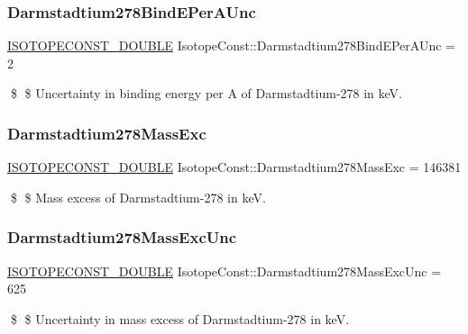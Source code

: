 \subsubsection{\texorpdfstring{Darmstadtium278\+Bind\+E\+Per\+A\+Unc}{Darmstadtium278BindEPerAUnc}}
{\footnotesize\ttfamily \mbox{\hyperlink{group___isotope_const-_macros_ga8f45a7272ce02c0b4c65c44636ed719a}{I\+S\+O\+T\+O\+P\+E\+C\+O\+N\+S\+T\+\_\+\+D\+O\+U\+B\+LE}} Isotope\+Const\+::\+Darmstadtium278\+Bind\+E\+Per\+A\+Unc = 2}

\$ \$ Uncertainty in binding energy per A of Darmstadtium-\/278 in keV. \mbox{\label{group___isotope_const-_darmstadtium-_ds278_ga666af747b9909806fc544dac715f6537}} 
\subsubsection{\texorpdfstring{Darmstadtium278\+Mass\+Exc}{Darmstadtium278MassExc}}
{\footnotesize\ttfamily \mbox{\hyperlink{group___isotope_const-_macros_ga8f45a7272ce02c0b4c65c44636ed719a}{I\+S\+O\+T\+O\+P\+E\+C\+O\+N\+S\+T\+\_\+\+D\+O\+U\+B\+LE}} Isotope\+Const\+::\+Darmstadtium278\+Mass\+Exc = 146381}

\$ \$ Mass excess of Darmstadtium-\/278 in keV. \mbox{\label{group___isotope_const-_darmstadtium-_ds278_gaf7870045f130d95065b8c020577cf480}} 
\subsubsection{\texorpdfstring{Darmstadtium278\+Mass\+Exc\+Unc}{Darmstadtium278MassExcUnc}}
{\footnotesize\ttfamily \mbox{\hyperlink{group___isotope_const-_macros_ga8f45a7272ce02c0b4c65c44636ed719a}{I\+S\+O\+T\+O\+P\+E\+C\+O\+N\+S\+T\+\_\+\+D\+O\+U\+B\+LE}} Isotope\+Const\+::\+Darmstadtium278\+Mass\+Exc\+Unc = 625}

\$ \$ Uncertainty in mass excess of Darmstadtium-\/278 in keV. \mbox{\label{group___isotope_const-_darmstadtium-_ds278_ga05d2176772e00792772e59e5bab6fd4c}} 
